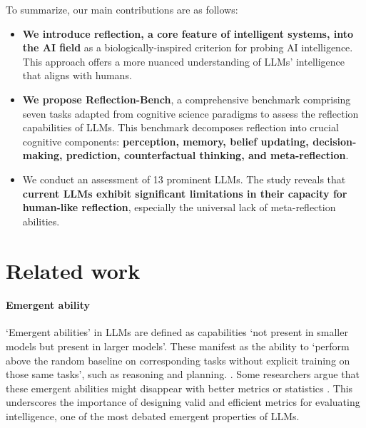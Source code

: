 To summarize, our main contributions are as follows:
\begin{itemize}
    \item     \textbf{We introduce reflection, a core feature of intelligent systems,  into the AI field} as a biologically-inspired criterion for probing AI intelligence. This approach offers a more nuanced understanding of LLMs' intelligence that aligns with humans.
    \item  \textbf{We propose Reflection-Bench}, a comprehensive benchmark comprising seven tasks adapted from cognitive science paradigms to assess the reflection capabilities of LLMs. This benchmark decomposes reflection into crucial cognitive components: \textbf{perception, memory, belief updating, decision-making, prediction, counterfactual thinking, and meta-reflection}. 
    \item We conduct an assessment of 13 prominent LLMs. The study reveals that \textbf{current LLMs exhibit significant limitations in their capacity for human-like reflection}, especially the universal lack of meta-reflection abilities.
\end{itemize}

\section{Related work}

\paragraph{Emergent ability}  `Emergent abilities' in LLMs are defined as capabilities `not present in smaller models but present in larger models'\cite{wei2022emergent}. These manifest as the ability to `perform above the random baseline on corresponding tasks without explicit training on those same tasks', such as reasoning and planning. \cite{lu2024emergentabilitieslargelanguage}. Some researchers argue that these emergent abilities might disappear with better metrics or statistics \cite{NEURIPS2023_adc98a26}. This underscores the importance of designing valid and efficient metrics for evaluating intelligence, one of the most debated emergent properties of LLMs. 

